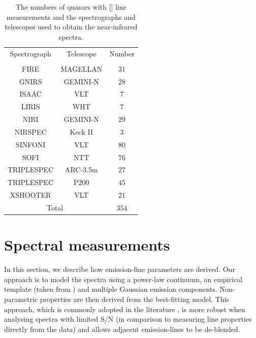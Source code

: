 \begin{table}
  \centering
  \footnotesize 
    \begin{tabular}{ccc} 
    \hline
    Spectrograph & Telescope & Number \\
                 &           & \\
    \hline
    FIRE         & MAGELLAN  & $31$ \\
    GNIRS        & GEMINI-N  & $28$ \\
    ISAAC        & VLT       & $7$ \\
    LIRIS        & WHT       & $7$ \\
    NIRI         & GEMINI-N  & $29$ \\
    NIRSPEC      & Keck II   & $3$ \\
    SINFONI      & VLT       & $80$ \\
    SOFI         & NTT       & $76$ \\
    TRIPLESPEC   & ARC-$3.5$m  & $27$ \\
    TRIPLESPEC   & P$200$      & $45$ \\
    XSHOOTER     & VLT       & $21$ \\
    \hline
    \multicolumn{2}{c}{Total} & $354$ \\
    \hline
    \end{tabular}
    \caption[{The numbers of quasars with [] line measurements and the spectrographs and telescopes used to obtain the near-infrared spectra.}]{The numbers of quasars with [] line measurements and the spectrographs and telescopes used to obtain the near-infrared spectra.}
  \label{tab:specnums_ch4}
\end{table} 

\section{Spectral measurements}

In this section, we describe how emission-line parameters are derived. 
Our approach is to model the spectra using a power-law continuum, an empirical  template (taken from \citealt{boroson92}) and multiple Gaussian emission components.
Non-parametric properties are then derived from the best-fitting model. 
This approach, which is commonly adopted in the literature \citep[e.g.][]{shen11,shen12,shen16a}, is more robust when analysing spectra with limited S/N (in comparison to measuring line properties directly from the data) and allows adjacent emission-lines to be de-blended.

